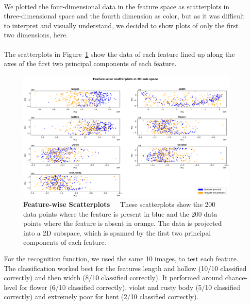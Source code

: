  \\
We plotted the four-dimensional data in the feature space as scatterplots in three-dimensional space and the fourth dimension as color, but as it was difficult to interpret and visually understand, we decided to show plots of only the first two dimensions, here. \\ 
\\ 
The scatterplots in Figure~\ref{fig:PCAscatter} show the data of each feature lined up along the axes of the first two principal components of each feature. \\

\begin{figure}[h]
	\centering
	\includegraphics[scale=0.35]{Figures/chapter04/pca_scatterplot.png}
	\decoRule
	\caption[Feature-wise Scatterplots]{\textbf{Feature-wise Scatterplots}~~~These scatterplots show the 200 data points where the feature is present in blue and the 200 data points where the feature is absent in orange. The data is projected into a 2D subspace, which is  spanned by the first two principal components of each feature. }
	\label{fig:PCAscatter}
\end{figure}

For the recognition function, we used the same 10 images, to test each feature. The classification worked best for the features length and hollow (10/10 classified correctly) and then width (8/10 classified correctly). It performed around chance-level for flower (6/10 classified correctly), violet and rusty body (5/10 classified correctly) and extremely poor for bent (2/10 classified correctly).   \\
\\
 
